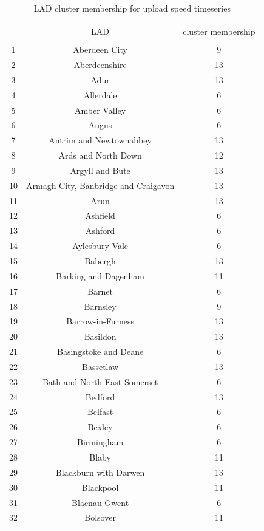 \documentclass[Royal,times,sageh]{sagej}
\begin{document}
\begin{table}[!htbp] \centering 
  \caption{LAD cluster membership for upload speed timeseries\label{cluster.membership}} 
  \label{} 
\footnotesize 
\begin{tabular}{@{\extracolsep{5pt}} ccc} 
\\[-1.8ex]\hline 
\hline \\[-1.8ex] 
 & LAD & cluster membership \\ 
\hline \\[-1.8ex] 
1 & Aberdeen City & 9 \\ 
2 & Aberdeenshire & 13 \\ 
3 & Adur & 13 \\ 
4 & Allerdale & 6 \\ 
5 & Amber Valley & 6 \\ 
6 & Angus & 6 \\ 
7 & Antrim and Newtownabbey & 13 \\ 
8 & Ards and North Down & 12 \\ 
9 & Argyll and Bute & 13 \\ 
10 & Armagh City, Banbridge and Craigavon & 13 \\ 
11 & Arun & 13 \\ 
12 & Ashfield & 6 \\ 
13 & Ashford & 6 \\ 
14 & Aylesbury Vale & 6 \\ 
15 & Babergh & 13 \\ 
16 & Barking and Dagenham & 11 \\ 
17 & Barnet & 6 \\ 
18 & Barnsley & 9 \\ 
19 & Barrow-in-Furness & 13 \\ 
20 & Basildon & 13 \\ 
21 & Basingstoke and Deane & 6 \\ 
22 & Bassetlaw & 13 \\ 
23 & Bath and North East Somerset & 6 \\ 
24 & Bedford & 13 \\ 
25 & Belfast & 6 \\ 
26 & Bexley & 6 \\ 
27 & Birmingham & 6 \\ 
28 & Blaby & 11 \\ 
29 & Blackburn with Darwen & 13 \\ 
30 & Blackpool & 11 \\ 
31 & Blaenau Gwent & 6 \\ 
32 & Bolsover & 11 \\ 

\end{tabular}
\end{table}
\end{document}
